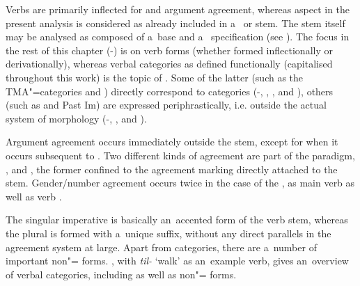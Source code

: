 Verbs are primarily inflected for  and argument agreement, whereas aspect in the present analysis is considered as already included in a~ or  stem. The stem itself may be analysed as composed of a~base and a~ specification (see ). The focus in the rest of this chapter (-) is on verb forms (whether formed inflectionally or derivationally), whereas verbal categories as defined functionally (capitalised throughout this work) is the topic of . Some of the latter (such as the TMA"=categories  and ) directly correspond to  categories (-, , , and ), others (such as  and Past Im) are expressed periphrastically, i.e. outside the actual system of  morphology (-, , and ). 


Argument agreement occurs immediately outside the stem, except for when it occurs subsequent to  . Two different kinds of agreement are part of the paradigm, , and , the former confined to the agreement marking directly attached to the  stem. Gender/number agreement occurs twice in the case of the , as main verb  as well as  verb . 


The singular imperative is basically an~accented form of the verb stem, whereas the plural is formed with a~unique suffix, without any direct parallels in the agreement system at large. Apart from   categories, there are a~number of important non"= forms. , with \textit{til-} `walk' as an~example verb, gives an~overview of verbal  categories, including  as well as non"= forms.


